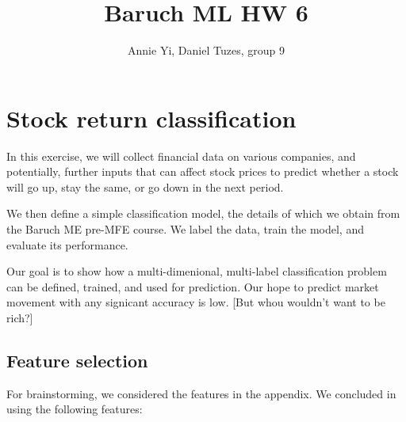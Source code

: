 \documentclass{article}
\title{Baruch ML HW 6}
\author{Annie Yi, Daniel Tuzes, group 9}
\begin{document}
\maketitle

\tableofcontents

\section{Stock return classification}
In this exercise, we will collect financial data on various companies,
and potentially, further inputs that can affect stock prices to predict
whether a stock will go up, stay the same, or go down in the next period.

We then define a simple classification model,
the details of which we obtain from the Baruch ME pre-MFE course.
We label the data, train the model, and evaluate its performance.

Our goal is to show how a multi-dimenional,
multi-label classification problem
can be defined, trained, and used for prediction. Our hope to predict
market movement with any signicant accuracy is low.
    [But whou wouldn't want to be rich?]

\subsection{Feature selection}
For brainstorming, we considered the features in the appendix.
We concluded in using the following features:
\end{document}
